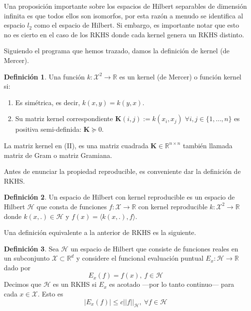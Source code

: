 \documentclass{article}
\numberwithin{equation}{section}
\theoremstyle{remark}
\theoremstyle{definition}
\newtheorem{definition}{Definición}
\theoremstyle{remark}
\theoremstyle{remark}
\begin{document}
Una proposición importante sobre los espacios de Hilbert separables de dimensión infinita es que todos ellos son isomorfos,
por esta razón a menudo se identifica al espacio $l_2$ como el espacio de Hilbert.
Si embargo, es importante notar que esto no es cierto en el caso de los RKHS donde
cada kernel genera un RKHS distinto.

Siguiendo el programa que hemos trazado, damos la definición de kernel (de Mercer).
\begin{definition}
    \label{df:kernel_kernel_matrix}
    Una función $k: \mathcal{X}^2 \to \mathbb{R}$ es un kernel (de Mercer) o función kernel si:
    \begin{enumerate}[I]
        \item Es simétrica, es decir, $k(x, y) = k(y, x)$.
        \item Su matriz kernel correspondiente $\bm{K}(i, j) := k(x_i, x_j)$ $\forall i, j \in \{1, \ldots, n\}$ es positiva semi-definida: $\bm{K} \succeq 0$.
    \end{enumerate}
\end{definition}

La matriz kernel en (II), es una matriz cuadrada $\bm{K} \in \mathbb{R}^{n \times n}$ también llamada matriz
de Gram o matriz Gramiana.

Antes de enunciar la propiedad reproducible, es conveniente dar la definición de RKHS.

\begin{definition}
    \label{df:rkhs}
    Un espacio de Hilbert con kernel reproducible es un espacio de Hilbert $\mathcal{H}$ que 
    consta de funciones $f:\mathcal{X} \to \mathbb{R}$ con kernel reproducible 
    $k:\mathcal{X}^2 \to \mathbb{R}$ donde $k(x, .) \in \mathcal{H}$ y $f(x) = \langle k(x, .), f \rangle$.
\end{definition}

Una definición equivalente a la anterior de RKHS es la siguiente.

\begin{definition}
    \label{df:rkhs_formal}
    Sea $\mathcal{H}$ un espacio de Hilbert que consiste de funciones reales en un subconjunto 
    $\mathcal{X} \subset \mathbb{R}^d$ y considere el funcional evaluación puntual 
    $E_x: \mathcal{H} \to \mathbb{R}$ dado por
    $$E_x(f) = f(x),\ f \in \mathcal{H}$$
    Decimos que $\mathcal{H}$ es un RKHS si $E_x$ es acotado ---por lo tanto continuo--- para cada
    $x \in \mathcal{X}$. Esto es
    $$|E_x(f)| \leq c ||f||_{\mathcal{H}},\ \forall f \in \mathcal{H}$$
\end{definition}
\end{document}
